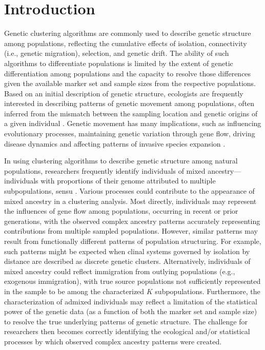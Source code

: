 
\section*{Introduction}

Genetic clustering algorithms are commonly used to describe genetic structure among populations, reflecting the cumulative
effects of isolation, connectivity (i.e., genetic migration), selection, and genetic drift.  The ability of such algorithms to differentiate populations
is limited by the extent of genetic differentiation among populations and the capacity to resolve those differences given the available marker
set and sample sizes from the respective populations.  Based on an initial description of genetic structure, ecologists are frequently
interested in describing patterns of genetic movement among populations, often inferred from the mismatch between the sampling location
and genetic origins of a given individual \citep{paetkau1995microsatellite,wilson2003bayesian}.  Genetic movement has many implications,
such as influencing evolutionary processes, maintaining genetic variation through gene flow, driving disease dynamics and affecting patterns
of invasive species expansion \citep{huestis2019windborne, estoup2010reconstructing}.

In using clustering algorithms to describe genetic structure among natural populations, researchers frequently identify individuals of
mixed ancestry---individuals with proportions of their genome attributed to multiple subpopulations, sensu \citet{pritchard2000inference}.
Various processes could contribute to the appearance of mixed ancestry in a clustering analysis.  Most directly, individuals may represent the
influences of gene flow among populations, occurring in recent or prior generations, with the observed complex ancestry patterns accurately
representing contributions from multiple sampled populations.  However, similar patterns may result from functionally different patterns of
population structuring.  For example, such patterns might be expected when clinal systems governed by isolation by distance are described
as discrete genetic clusters.
Alternatively, individuals of mixed ancestry could reflect immigration from outlying populations (e.g., exogenous immigration), with true source
populations not sufficiently
represented in the sample to be among the characterized $K$ subpopulations.
Furthermore, the characterization of admixed individuals may reflect a limitation of the statistical power of the genetic data (as a function of both the marker set and sample size) to resolve the true underlying patterns of genetic structure.
 The challenge for researchers then becomes correctly identifying the ecological and/or statistical processes by which observed complex
 ancestry patterns were created.

